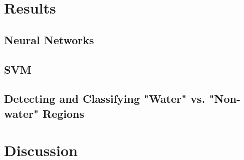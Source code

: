 \documentclass[12pt]{article}
\begin{document}
\section{Results}
	\subsection{Neural Networks}
	\subsection{SVM}
	\subsection{Detecting and Classifying "Water" vs. "Non-water" Regions}

\section{Discussion}


   
\end{document}
